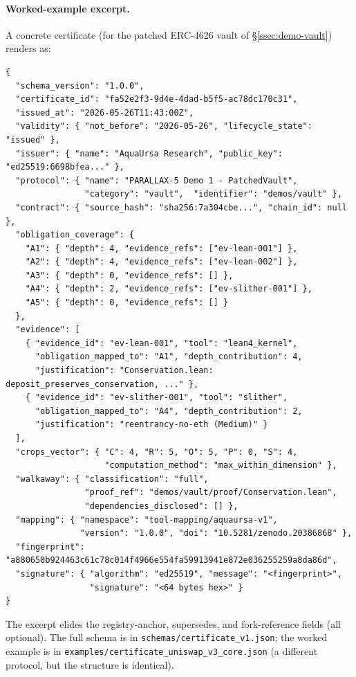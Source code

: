 \documentclass[11pt,a4paper]{article}
\begin{document}
\paragraph{Worked-example excerpt.} A concrete certificate (for the patched ERC-4626 vault of \S\ref{ssec:demo-vault}) renders as:

\begin{lstlisting}[basicstyle=\ttfamily\footnotesize,frame=single,backgroundcolor=\color{leangray},breaklines=true]
{
  "schema_version": "1.0.0",
  "certificate_id": "fa52e2f3-9d4e-4dad-b5f5-ac78dc170c31",
  "issued_at": "2026-05-26T11:43:00Z",
  "validity": { "not_before": "2026-05-26", "lifecycle_state": "issued" },
  "issuer": { "name": "AquaUrsa Research", "public_key": "ed25519:6698bfea..." },
  "protocol": { "name": "PARALLAX-5 Demo 1 - PatchedVault",
                "category": "vault",  "identifier": "demos/vault" },
  "contract": { "source_hash": "sha256:7a304cbe...", "chain_id": null },
  "obligation_coverage": {
    "A1": { "depth": 4, "evidence_refs": ["ev-lean-001"] },
    "A2": { "depth": 4, "evidence_refs": ["ev-lean-002"] },
    "A3": { "depth": 0, "evidence_refs": [] },
    "A4": { "depth": 2, "evidence_refs": ["ev-slither-001"] },
    "A5": { "depth": 0, "evidence_refs": [] }
  },
  "evidence": [
    { "evidence_id": "ev-lean-001", "tool": "lean4_kernel",
      "obligation_mapped_to": "A1", "depth_contribution": 4,
      "justification": "Conservation.lean: deposit_preserves_conservation, ..." },
    { "evidence_id": "ev-slither-001", "tool": "slither",
      "obligation_mapped_to": "A4", "depth_contribution": 2,
      "justification": "reentrancy-no-eth (Medium)" }
  ],
  "crops_vector": { "C": 4, "R": 5, "O": 5, "P": 0, "S": 4,
                    "computation_method": "max_within_dimension" },
  "walkaway": { "classification": "full",
                "proof_ref": "demos/vault/proof/Conservation.lean",
                "dependencies_disclosed": [] },
  "mapping": { "namespace": "tool-mapping/aquaursa-v1",
               "version": "1.0.0", "doi": "10.5281/zenodo.20386868" },
  "fingerprint": "a880650b924463c61c78c014f4966e554fa59913941e872e036255259a8da86d",
  "signature": { "algorithm": "ed25519", "message": "<fingerprint>",
                 "signature": "<64 bytes hex>" }
}
\end{lstlisting}

\noindent The excerpt elides the registry-anchor, supersedes, and fork-reference fields (all optional). The full schema is in \texttt{schemas/certificate\_v1.json}; the worked example is in \texttt{examples/certificate\_uniswap\_v3\_core.json} (a different protocol, but the structure is identical).
\end{document}
